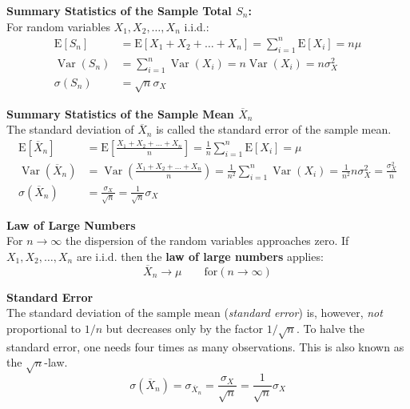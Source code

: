 \documentclass[11pt]{article}
\newcommand*\samplemean[1]{\overline{#1}}
\newcommand*\ev[1]{\mathrel{\text{E}\left[#1\right]}}
\newcommand*\Var[1]{\mathop{\text{Var}}\left(#1\right)}
\begin{document}
\begin{definition}
	\textbf{Summary Statistics of the Sample Total $S_n$:}\\
	For random variables $X_1,X_2,\dots,X_n$ i.i.d.:
	\begin{align*}
		\ev{S_n} &= \ev{X_1 + X_2 + \dots + X_n} = \sum_{i=1}^{n} \ev{X_i} = n\mu\\
		\Var{S_n} &= \sum_{i=1}^{n}\Var{X_i} = n\Var{X_i} = n\sigma_X^2\\
		\sigma(S_n) &= \sqrt{n}\sigma_X
	\end{align*}
\end{definition}

\begin{definition}
	\textbf{Summary Statistics of the Sample Mean $\samplemean{X}_n$}\\
	The standard deviation of $\samplemean{X}_n$ is called the standard error of the sample mean.
	\begin{align*}
		\ev{\samplemean{X}_n} &= \ev{\frac{X_1 + X_2 + \dots + X_n}{n}} = \frac{1}{n} \sum_{i=1}^{n} \ev{X_i} = \mu\\
		\Var{\samplemean{X}_n} &= \Var{\frac{X_1 + X_2 + \dots + X_n}{n}} = \frac{1}{n^2} \sum_{i=1}^{n}\Var{X_i} = \frac{1}{n^2}n\sigma_X^2 = \frac{\sigma_X^2}{n}\\
		\sigma (\samplemean{X}_n) &= \frac{\sigma_X}{\sqrt{n}} = \frac{1}{\sqrt{n}} \sigma_X
	\end{align*}
\end{definition}

\begin{definition}
	\textbf{Law of Large Numbers}\\
	For $n\rightarrow\infty$ the dispersion of the random variables approaches zero. If $X_1,X_2,\dots,X_n$ are i.i.d. then the \textbf{law of large numbers} applies:
	\begin{equation*}
		\samplemean{X}_n \longrightarrow \mu \qquad\text{for} (n\rightarrow\infty)
	\end{equation*}
\end{definition}

\begin{definition}
	\textbf{Standard Error}\\
	The standard deviation of the sample mean (\textit{standard error}) is, however, \textit{not} proportional
	to $1/n$ but decreases only by the factor $1/\sqrt{n}$. To halve the standard error, one needs four times as many observations. This is also known as the $\sqrt{n}$-law.
	\begin{equation*}
		\sigma (\samplemean{X}_n) = \sigma_{\samplemean{X}_n} = \frac{\sigma_X}{\sqrt{n}} = \frac{1}{\sqrt{n}} \sigma_X
	\end{equation*}
\end{definition}
\end{document}
